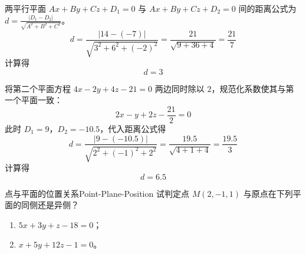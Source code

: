 \begin{solution}

    两平行平面 $Ax + By + Cz + D_1 = 0$ 与 $Ax + By + Cz + D_2 = 0$ 间的距离公式为 $d = \frac{|D_1 - D_2|}{\sqrt{A^2 + B^2 + C^2}}$。
    \begin{equation*}
        d = \frac{|14 - (-7)|}{\sqrt{3^2 + 6^2 + (-2)^2}} = \frac{21}{\sqrt{9 + 36 + 4}} = \frac{21}{7}
    \end{equation*}
    计算得
    \begin{equation*}
        \boxed{d = 3}
    \end{equation*}


    将第二个平面方程 $4x - 2y + 4z - 21 = 0$ 两边同时除以 $2$，规范化系数使其与第一个平面一致：
    \begin{equation*}
        2x - y + 2z - \frac{21}{2} = 0
    \end{equation*}
    此时 $D_1 = 9$，$D_2 = -10.5$，代入距离公式得
    \begin{equation*}
        d = \frac{|9 - (-10.5)|}{\sqrt{2^2 + (-1)^2 + 2^2}} = \frac{19.5}{\sqrt{4 + 1 + 4}} = \frac{19.5}{3}
    \end{equation*}
    计算得
    \begin{equation*}
        \boxed{d = 6.5}
    \end{equation*}
\end{solution}


\begin{problem}{点与平面的位置关系}{Point-Plane-Position}
    试判定点 $M(2, -1, 1)$ 与原点在下列平面的同侧还是异侧？
    \begin{enumerate}
        \item $5x + 3y + z - 18 = 0$；
        \item $x + 5y + 12z - 1 = 0$。
    \end{enumerate}
\end{problem}


